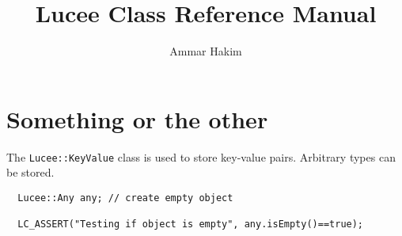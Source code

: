 \documentclass[11pt]{article}
\title{Lucee Class Reference Manual}
\author{Ammar Hakim}
\date{}
\begin{document}
\maketitle

\section{Something or the other}

The \verb=Lucee::KeyValue= class is used to store key-value
pairs. Arbitrary types can be stored.
\begin{verbatim}
  Lucee::Any any; // create empty object

  LC_ASSERT("Testing if object is empty", any.isEmpty()==true);
\end{verbatim}
\end{document}
